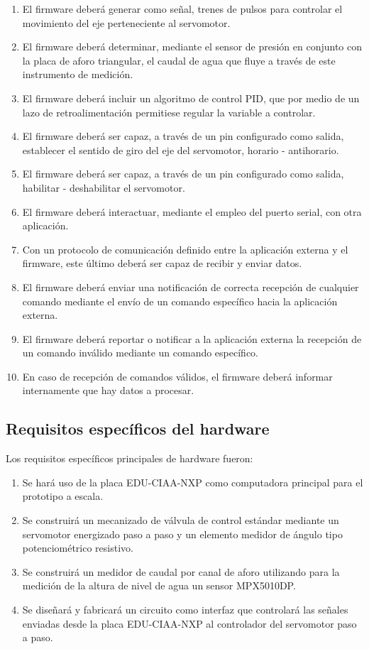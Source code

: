 \begin{enumerate}
	\item El firmware deberá generar como señal, trenes de pulsos para controlar el movimiento del eje perteneciente al servomotor.
	\item El firmware deberá determinar, mediante el sensor de presión en conjunto con la placa de aforo triangular, el caudal de agua que fluye a través de este instrumento de medición.
	\item  El firmware deberá incluir un algoritmo de control PID, que por medio de un lazo de retroalimentación permitiese regular la variable a controlar.
	\item El firmware deberá ser capaz, a través de un pin configurado como salida, establecer el sentido de giro del eje del servomotor, horario - antihorario.
	\item El firmware deberá ser capaz, a través de un pin configurado como salida, habilitar - deshabilitar el servomotor.
	\item El firmware deberá interactuar, mediante el empleo del puerto serial, con otra aplicación. 	  
	\item Con un protocolo de comunicación definido entre la aplicación externa y el firmware, este último deberá ser capaz de recibir y enviar datos.
	\item El firmware deberá enviar una notificación de correcta recepción de cualquier comando mediante el envío de un comando específico hacia la aplicación externa.  
	\item El firmware deberá reportar o notificar a la aplicación externa la recepción de un comando inválido mediante un comando específico.
	\item En caso de recepción de comandos válidos, el firmware deberá informar internamente que hay datos a procesar. 
\end{enumerate}

\subsection{Requisitos específicos del hardware}
\label{subsec:requisitoshw}
 Los requisitos específicos principales de hardware fueron:
\begin{enumerate}
	\item Se hará uso de la placa EDU-CIAA-NXP \citep{CIAA} como computadora principal para el prototipo a escala.
	\item Se construirá un mecanizado de  válvula de control estándar mediante un servomotor energizado paso a paso y un elemento medidor de ángulo tipo potenciométrico resistivo.
	\item Se construirá un medidor de caudal por canal de aforo utilizando para la medición de la altura de nivel de agua un sensor MPX5010DP.
	\item Se diseñará y fabricará un circuito como interfaz que controlará las señales enviadas desde la placa EDU-CIAA-NXP al controlador del servomotor paso a paso. 
\end{enumerate}

